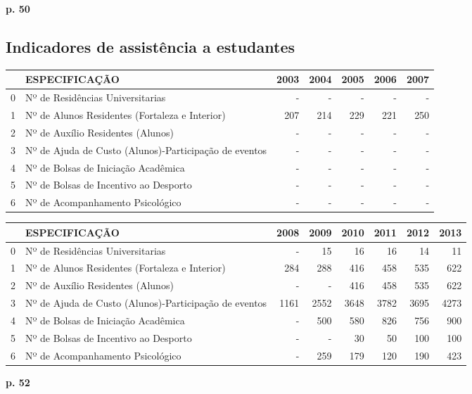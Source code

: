 \documentclass{report}
\begin{document}
\textbf{p. 50}

\subsection{Indicadores de assistência a estudantes}
\begin{tabular}{llrrrrr}
\toprule
{} &                                          ESPECIFICAÇÃO &  2003 &  2004 &  2005 &  2006 &  2007 \\
\midrule
0 &  Nº de Residências Universitarias & - & - & - & - & - \\
1 &  Nº de Alunos Residentes (Fortaleza e Interior) &  207 &  214 &  229 &  221 &  250 \\
2 &  Nº de Auxílio Residentes (Alunos) & - & - & - & - & - \\
3 &  Nº de Ajuda de Custo (Alunos)-Participação de eventos & - & - & - & - & - \\
4 &  Nº de Bolsas de Iniciação Acadêmica & - & - & - & - & - \\
5 &  Nº de Bolsas de Incentivo ao Desporto & - & - & - & - & - \\
6 &  Nº de Acompanhamento Psicológico & - & - & - & - & - \\
\bottomrule
\end{tabular}
\begin{tabular}{llrrrrrr}
\toprule
{} &                                          ESPECIFICAÇÃO &  2008 &  2009 &  2010 &  2011 &  2012 &  2013 \\
\midrule
0 &  Nº de Residências Universitarias & - &  15 &  16 &  16 &  14 &  11 \\
1 &  Nº de Alunos Residentes (Fortaleza e Interior) &  284 &  288 &  416 &  458 &  535 &  622 \\
2 &  Nº de Auxílio Residentes (Alunos) & - & - &  416 &  458 &  535 &  622 \\
3 &  Nº de Ajuda de Custo (Alunos)-Participação de eventos &  1161 &  2552 &  3648 &  3782 &  3695 &  4273 \\
4 &  Nº de Bolsas de Iniciação Acadêmica & - &  500 &  580 &  826 &  756 &  900 \\
5 &  Nº de Bolsas de Incentivo ao Desporto & - & - &  30 &  50 &  100 &  100 \\
6 &  Nº de Acompanhamento Psicológico & - &  259 &  179 &  120 &  190 &  423 \\
\bottomrule
\end{tabular}

\textbf{p. 52}
\end{document}
